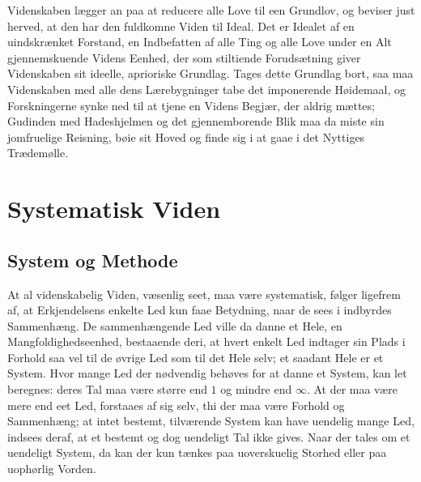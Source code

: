 \documentclass[12pt]{book}
\newcommand{\apage}[1]{\marginnote{\footnotesize\textit{[#1]}}}
\begin{document}
Videnskaben lægger an paa at reducere alle Love til een Grundlov, og
beviser just herved, at den har den fuldkomne Viden til Ideal. Det er
Idealet af en uindskrænket Forstand, en Indbefatten af alle Ting og alle
Love under en Alt gjennemskuende Videns Eenhed, der som stiltiende
Forudsætning giver Videnskaben sit ideelle, aprioriske Grundlag. Tages
dette Grundlag bort, saa maa Videnskaben med alle dens Lærebygninger tabe
det imponerende Høidemaal, og Forskningerne synke ned til at tjene en
Videns Begjær, der aldrig mættes; Gudinden med Hadeshjelmen og det
gjennemborende Blik maa da miste sin jomfruelige Reisning, bøie sit Hoved
og finde sig i at gaae i det Nyttiges Trædemølle.


\chapter{Systematisk Viden}

\section{System og Methode}
\label{sec:8}

\noindent At al videnskabelig Viden, væsenlig seet, maa være systematisk,
følger ligefrem af, at Erkjendelsens enkelte Led kun faae Betydning, naar
de sees i indbyrdes Sammenhæng. De sammenhængende Led ville da danne et
Hele, en Mangfoldighedseenhed, bestaaende \apage{70} deri, at hvert enkelt Led
indtager sin Plads i Forhold saa vel til de øvrige Led som til det Hele
selv; et saadant Hele er et System. Hvor mange Led der nødvendig behøves
for at danne et System, kan let beregnes: deres Tal maa være større end
$1$ og mindre end $\infty$. At der maa være mere end eet Led, forstaaes af
sig selv, thi der maa være Forhold og Sammenhæng; at intet bestemt,
tilværende System kan have uendelig mange Led, indsees deraf, at et
bestemt og dog uendeligt Tal ikke gives. Naar der tales om et uendeligt
System, da kan der kun tænkes paa uoverskuelig Storhed eller paa uophørlig
Vorden.
\end{document}
